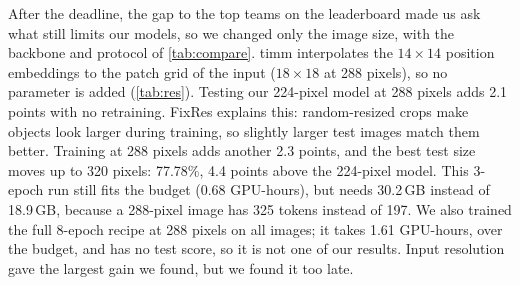 After the deadline, the gap to the top teams on the leaderboard made us ask what still limits our models, so we changed only the image size, with the backbone and protocol of \cref{tab:compare}.
timm interpolates the $14{\times}14$ position embeddings to the patch grid of the input ($18{\times}18$ at 288 pixels), so no parameter is added (\cref{tab:res}).
Testing our 224-pixel model at 288 pixels adds 2.1 points with no retraining.
FixRes \citep{touvron2019fixres} explains this: random-resized crops make objects look larger during training, so slightly larger test images match them better.
Training at 288 pixels adds another 2.3 points, and the best test size moves up to 320 pixels: 77.78\%, 4.4 points above the 224-pixel model.
This 3-epoch run still fits the budget (0.68 GPU-hours), but needs 30.2\,GB instead of 18.9\,GB, because a 288-pixel image has 325 tokens instead of 197.
We also trained the full 8-epoch recipe at 288 pixels on all images; it takes 1.61 GPU-hours, over the budget, and has no test score, so it is not one of our results.
Input resolution gave the largest gain we found, but we found it too late.
